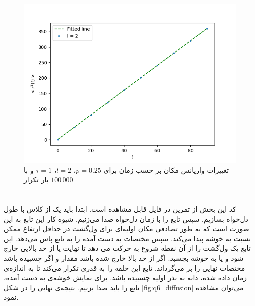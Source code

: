 \documentclass[11pt, a4paper]{article}
\begin{document}
\begin{figure}[h!]
  \begin{minipage}[b]{0.47\textwidth}
    \includegraphics[width=\textwidth]{q5_var_2_100_10_100000.png}
    \caption{تغییرات واریانس مکان بر حسب زمان برای $p = 0.25$، $l = 2$، $\tau = 1$ و با $100\,000$ بار تکرار}
    \label{fig:q5_2}
  \end{minipage}
\end{figure}


\section{\textbf{}}
کد این بخش از تمرین در فایل
قابل مشاهده است.
ابتدا باید یک
از کلاس
با طول دل‌خواه بسازیم.
سپس تابع
را با زمان دل‌خواه صدا می‌زنیم.
شیوه کار این تابع به این صورت است که به طور تصادفی مکان اولیه‌ای برای ول‌گشت
در حداقل ارتفاع ممکن نسبت به خوشه پیدا می‌کند.
سپس مختصات به دست آمده را به تابع
پاس می‌دهد.
این تابع یک ول‌گشت را از آن نقطه شروع به حرکت می دهد تا نهایت یا از حد بالایی خارج شود و یا به خوشه بچسبد.
اگر از حد بالا خارج شده باشد مقدار
و اگر چسبیده باشد مختصات نهایی را بر می‌گرداند.
تابع
این حلقه را به قدری تکرار می‌کند تا به اندازه‌ی زمان داده شده، دانه به بذر اولیه چسبیده باشد.
برای نمایش خوشه‌ی به دست آمده، تابع
را باید صدا بزنیم.
نتیجه‌ی نهایی را در شکل‌
\ref{fig:q6_diffusion}
می‌توان مشاهده نمود.
\end{document}
